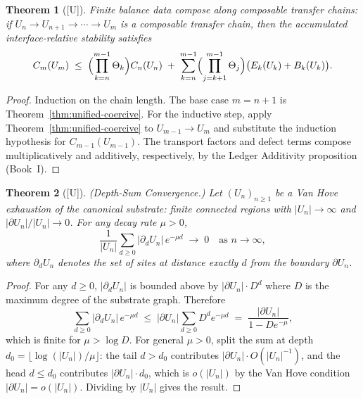 \documentclass[12pt,oneside]{amsbook}
\theoremstyle{plain}
\newtheorem{theorem}{Theorem}[section]
\theoremstyle{definition}
\theoremstyle{remark}
\newcommand{\status}[1]{\textup{[#1]}}
\begin{document}
\begin{theorem}[\status{U}]\label{thm:balance-composable}
Finite balance data compose along composable transfer chains: if
$U_n \to U_{n+1} \to \cdots \to U_m$ is a composable transfer chain,
then the accumulated interface-relative stability satisfies
\[
  C_m(U_m)
  \;\leq\;
  \Bigl(\prod_{k=n}^{m-1} \Theta_k\Bigr) C_n(U_n)
  \;+\;
  \sum_{k=n}^{m-1} \Bigl(\prod_{j=k+1}^{m-1} \Theta_j\Bigr)
    \bigl(E_k(U_k) + B_k(U_k)\bigr).
\]
\end{theorem}

\begin{proof}
Induction on the chain length.  The base case $m = n+1$ is
Theorem~\ref{thm:unified-coercive}.  For the inductive step, apply
Theorem~\ref{thm:unified-coercive} to $U_{m-1} \to U_m$ and
substitute the induction hypothesis for $C_{m-1}(U_{m-1})$.
The transport factors and defect terms compose multiplicatively and
additively, respectively, by the Ledger Additivity proposition
(Book~I).
\end{proof}


\begin{theorem}[\status{U}]\label{thm:depth-sum}
\textup{(Depth-Sum Convergence.)}  Let $(U_n)_{n \geq 1}$ be a Van
Hove exhaustion of the canonical substrate: finite connected regions
with $|U_n| \to \infty$ and $|\partial U_n|/|U_n| \to 0$.  For any
decay rate $\mu > 0$,
\[
  \frac{1}{|U_n|}\sum_{d \geq 0} |\partial_d U_n|\, e^{-\mu d}
  \;\longrightarrow\; 0
  \quad \text{as } n \to \infty,
\]
where $\partial_d U_n$ denotes the set of sites at distance exactly
$d$ from the boundary $\partial U_n$.
\end{theorem}

\begin{proof}
For any $d \geq 0$, $|\partial_d U_n|$ is bounded above by
$|\partial U_n| \cdot D^d$ where $D$ is the maximum degree of the
substrate graph.  Therefore
\[
  \sum_{d \geq 0} |\partial_d U_n|\, e^{-\mu d}
  \;\leq\; |\partial U_n| \sum_{d \geq 0} D^d e^{-\mu d}
  \;=\; \frac{|\partial U_n|}{1 - D e^{-\mu}},
\]
which is finite for $\mu > \log D$.  For general $\mu > 0$, split the
sum at depth $d_0 = \lfloor \log(|U_n|)/\mu \rfloor$: the tail
$d > d_0$ contributes $|\partial U_n| \cdot O(|U_n|^{-1})$, and the
head $d \leq d_0$ contributes $|\partial U_n| \cdot d_0$, which is
$o(|U_n|)$ by the Van Hove condition $|\partial U_n| = o(|U_n|)$.
Dividing by $|U_n|$ gives the result.
\end{proof}
\end{document}

